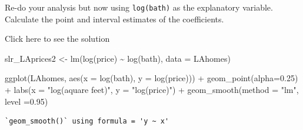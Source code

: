 \documentclass[
  letterpaper,
  DIV=11,
  numbers=noendperiod]{scrartcl}
\newenvironment{Shaded}{\begin{snugshade}}{\end{snugshade}}
\newcommand{\AttributeTok}[1]{\textcolor[rgb]{0.40,0.45,0.13}{#1}}
\newcommand{\FloatTok}[1]{\textcolor[rgb]{0.68,0.00,0.00}{#1}}
\newcommand{\FunctionTok}[1]{\textcolor[rgb]{0.28,0.35,0.67}{#1}}
\newcommand{\NormalTok}[1]{\textcolor[rgb]{0.00,0.23,0.31}{#1}}
\newcommand{\OtherTok}[1]{\textcolor[rgb]{0.00,0.23,0.31}{#1}}
\newcommand{\SpecialCharTok}[1]{\textcolor[rgb]{0.37,0.37,0.37}{#1}}
\newcommand{\StringTok}[1]{\textcolor[rgb]{0.13,0.47,0.30}{#1}}
\begin{document}
\begin{tcolorbox}[enhanced jigsaw, toprule=.15mm, breakable, bottomtitle=1mm, coltitle=black, colback=white, arc=.35mm, left=2mm, leftrule=.75mm, opacitybacktitle=0.6, colframe=quarto-callout-warning-color-frame, colbacktitle=quarto-callout-warning-color!10!white, toptitle=1mm, titlerule=0mm, opacityback=0, title={Task 3}, rightrule=.15mm, bottomrule=.15mm]

Re-do your analysis but now using \texttt{log(bath)} as the explanatory
variable. Calculate the point and interval estimates of the
coefficients.

Click here to see the solution

\begin{Shaded}
\begin{Highlighting}[]
\NormalTok{slr\_LAprices2 }\OtherTok{\textless{}{-}} \FunctionTok{lm}\NormalTok{(}\FunctionTok{log}\NormalTok{(price) }\SpecialCharTok{\textasciitilde{}} \FunctionTok{log}\NormalTok{(bath), }\AttributeTok{data =}\NormalTok{ LAhomes)}

\FunctionTok{ggplot}\NormalTok{(LAhomes, }\FunctionTok{aes}\NormalTok{(}\AttributeTok{x =}  \FunctionTok{log}\NormalTok{(bath), }\AttributeTok{y =} \FunctionTok{log}\NormalTok{(price))) }\SpecialCharTok{+}
  \FunctionTok{geom\_point}\NormalTok{(}\AttributeTok{alpha=}\FloatTok{0.25}\NormalTok{) }\SpecialCharTok{+}
  \FunctionTok{labs}\NormalTok{(}\AttributeTok{x =} \StringTok{"log(aquare feet)"}\NormalTok{, }\AttributeTok{y =} \StringTok{"log(price)"}\NormalTok{) }\SpecialCharTok{+}
  \FunctionTok{geom\_smooth}\NormalTok{(}\AttributeTok{method =} \StringTok{"lm"}\NormalTok{, }\AttributeTok{level =}\FloatTok{0.95}\NormalTok{)}
\end{Highlighting}
\end{Shaded}

\begin{verbatim}
`geom_smooth()` using formula = 'y ~ x'
\end{verbatim}


\end{tcolorbox}
\end{document}
